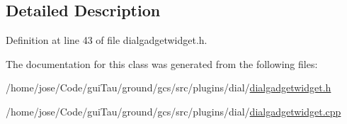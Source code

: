 \subsection{Detailed Description}


Definition at line 43 of file dialgadgetwidget.\-h.



The documentation for this class was generated from the following files\-:\begin{DoxyCompactItemize}
\item 
/home/jose/\-Code/gui\-Tau/ground/gcs/src/plugins/dial/\hyperlink{dialgadgetwidget_8h}{dialgadgetwidget.\-h}\item 
/home/jose/\-Code/gui\-Tau/ground/gcs/src/plugins/dial/\hyperlink{dialgadgetwidget_8cpp}{dialgadgetwidget.\-cpp}\end{DoxyCompactItemize}
